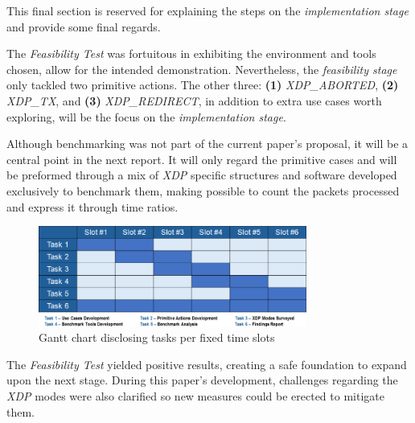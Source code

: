 This final section is reserved for explaining the steps on the \textit{implementation stage} and provide some final regards.

The \textit{Feasibility Test} was fortuitous in exhibiting the environment and tools chosen, allow for the intended demonstration.
Nevertheless, the \textit{feasibility stage} only tackled two primitive actions.
The other three: \textbf{(1)} \textit{XDP\_ABORTED}, \textbf{(2)} \textit{XDP\_TX}, and \textbf{(3)} \textit{XDP\_REDIRECT}, in addition to extra use cases worth exploring, will be the focus on the \textit{implementation stage}. 

Although benchmarking was not part of the current paper's proposal, it will be a central point in the next report.
It will only regard the primitive cases and will be preformed through a mix of \textit{XDP} specific structures\cite{XDP} and software developed exclusively to benchmark them, making possible to count the packets processed and express it through time ratios.

\begin{figure}[h]
    \centering
    \includegraphics[width=250pt]{src/figures/roadmap.png}
    \caption{Gantt chart disclosing tasks per fixed time slots}
    \label{fig:roadmap}
\end{figure}

The \textit{Feasibility Test} yielded positive results, creating a safe foundation to expand upon the next stage.
During this paper's development, challenges regarding the \textit{XDP} modes were also clarified so new measures could be erected to mitigate them.